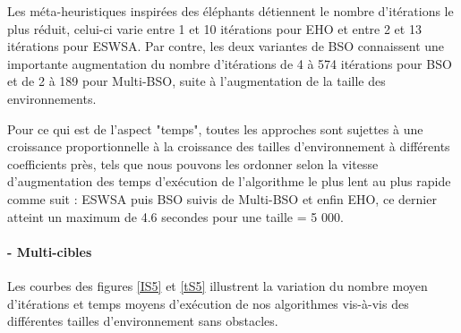 	Les méta-heuristiques inspirées des éléphants détiennent le nombre d'itérations le plus réduit, celui-ci varie entre 1 et 10 itérations pour EHO et entre 2 et 13 itérations pour ESWSA. Par contre, les deux variantes de BSO connaissent une importante augmentation du nombre d'itérations de 4 à 574 itérations pour BSO et de 2 à 189 pour Multi-BSO, suite à l'augmentation de la taille des environnements.\\
	\vspace{-0.2cm}
	
	Pour ce qui est de l'aspect "temps", toutes les approches sont sujettes à une croissance proportionnelle à la croissance des tailles d'environnement à différents coefficients près, tels que nous pouvons les ordonner selon la vitesse d'augmentation des temps d'exécution de l'algorithme le plus lent au plus rapide comme suit : ESWSA puis BSO suivis de Multi-BSO et enfin EHO, ce dernier atteint un maximum de 4.6 secondes pour une taille = 5 000.
	
	\noindent
	\hspace{-0.5cm}
	\begin{minipage}[t]{0.55\textwidth}
		\captionsetup{width=0.8\linewidth}
		\centering{}
		\label{IS1}
	\end{minipage}\hfill
	\hspace{-0.5cm}
	\begin{minipage}[t]{0.55\textwidth}
		\captionsetup{width=0.8\linewidth}
		\centering{}
		\label{tS1}
	\end{minipage}\hfill
	
	
	\noindent
	\paragraph{- Multi-cibles}
	\textbf{ }
	
	Les courbes des figures \ref{IS5} et \ref{tS5} illustrent la variation du nombre moyen d'itérations et temps moyens d'exécution de nos algorithmes vis-à-vis des différentes tailles d'environnement sans obstacles.\\
	\vspace{-0.2cm}
	
